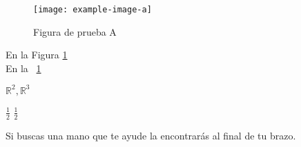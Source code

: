 \documentclass[a4paper,11pt]{article}
\newcommand{\figref}[1]{\figurename~\ref{#1}}
\newcommand{\planoR}[1][2]{\mathbb{R}^{#1}}
\let\oldfrac=\frac
\renewcommand{\frac}[2]{\ensuremath{\oldfrac{#1}{#2}}}
\let\oldquote=\quote
\let\oldendquote=\endquote
\renewenvironment{quote}
    {\vspace{10pt}\leftbar\vspace*{-6pt}\oldquote}
    {\oldendquote\endleftbar\vspace{10pt}}
\begin{document}
  \begin{figure}
    \centering
    \texttt{[image: example-image-a]} 
    \caption{Figura de prueba A}
    \label{figura}
  \end{figure}
  
  En la Figura \ref{figura} \\
  En la \figref{figura}
  
  $\planoR, \planoR[3]$
  
  \frac{1}{2}
  $\oldfrac{1}{2}$
  
  \begin{quote}
   Si buscas una mano que te ayude la encontrarás al final de tu brazo.
  \end{quote}
  
\end{document}
